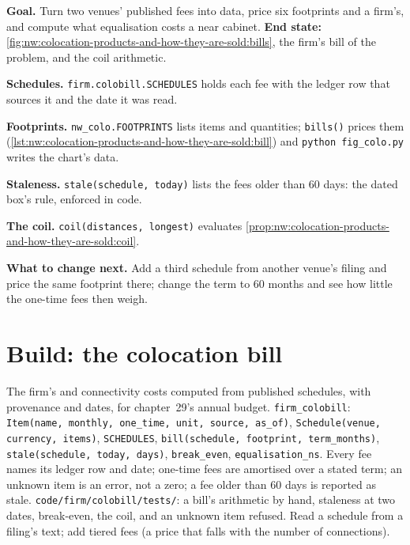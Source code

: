 \begin{tutorial}
\textbf{Goal.} Turn two venues' published fees into data, price six footprints and a firm's, and compute what equalisation costs a near
cabinet. \textbf{End state:} \cref{fig:nw:colocation-products-and-how-they-are-sold:bills}, the firm's bill of the problem, and the coil
arithmetic.
\begin{tutsteps}
\item \textbf{Schedules.} \texttt{firm.colobill.SCHEDULES} holds each fee with the ledger row that sources it and the date it was read.
\item \textbf{Footprints.} \texttt{nw\_colo.FOOTPRINTS} lists items and quantities; \texttt{bills()} prices them
  (\cref{lst:nw:colocation-products-and-how-they-are-sold:bill}) and \texttt{python fig\_colo.py} writes the chart's data.
\item \textbf{Staleness.} \texttt{stale(schedule, today)} lists the fees older than 60 days: the dated box's rule, enforced in code.
\item \textbf{The coil.} \texttt{coil(distances, longest)} evaluates \cref{prop:nw:colocation-products-and-how-they-are-sold:coil}.
\end{tutsteps}
\textbf{What to change next.} Add a third schedule from another venue's filing and price the same footprint there; change the term to 60
months and see how little the one-time fees then weigh.
\end{tutorial}

\section{Build: the colocation bill}\label{bld:nw:colocation-products-and-how-they-are-sold:colobill}

\begin{build}
 The firm's  and connectivity costs computed from published schedules, with provenance and dates, for
chapter~29's annual budget.
 \texttt{firm\_colobill}: \texttt{Item(name, monthly, one\_time, unit, source, as\_of)}, \texttt{Schedule(venue, currency,
items)}, \texttt{SCHEDULES}, \texttt{bill(schedule, footprint, term\_months)}, \texttt{stale(schedule, today, days)}, \texttt{break\_even},
\texttt{equalisation\_ns}.
 Every fee names its ledger row and date; one-time fees are amortised over a stated term; an unknown item is an error, not a
zero; a fee older than 60 days is reported as stale.
 \texttt{code/firm/colobill/tests/}: a bill's arithmetic by hand, staleness at two dates, break-even, the coil, and an
unknown item refused.
 Read a schedule from a filing's text; add tiered fees (a price that falls with the number of connections).
\end{build}

